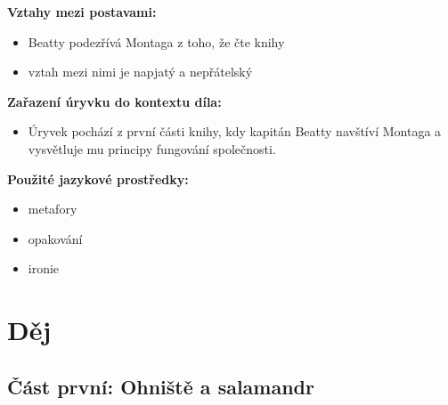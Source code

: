 \documentclass[12pt,a4paper]{article}
\begin{document}
\begin{tcolorbox}[breakable]
\textbf{Vztahy mezi postavami:}
\begin{itemize}
\item Beatty podezřívá Montaga z toho, že čte knihy
\item vztah mezi nimi je napjatý a nepřátelský
\end{itemize}

\textbf{Zařazení úryvku do kontextu díla:}
\begin{itemize}
\item Úryvek pochází z první části knihy, kdy kapitán Beatty navštíví Montaga a vysvětluje mu principy fungování společnosti.
\end{itemize}

\textbf{Použité jazykové prostředky:}
\begin{itemize}
\item metafory
\item opakování
\item ironie
\end{itemize}

\end{tcolorbox}
\section*{Děj}
\subsection*{Část první: Ohniště a salamandr}
\end{document}
